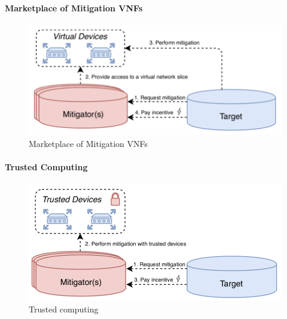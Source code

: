 \paragraph{Marketplace of Mitigation VNFs}
\begin{figure}[ht]
  \begin{center}
  \includegraphics[scale=0.6]{Talk7/img/ddos/cooperative_network_marketplace_vnfs}
  \end{center}
  \caption{Marketplace of Mitigation VNFs}
  \label{ddos_marketplace_vnf}
\end{figure}

\paragraph{Trusted Computing}
\begin{figure}[ht]
  \begin{center}
  \includegraphics[scale=0.6]{Talk7/img/ddos/cooperative_network_trusted_computing}
  \end{center}
  \caption{Trusted computing}
  \label{ddos_trusted_computing}
\end{figure}


